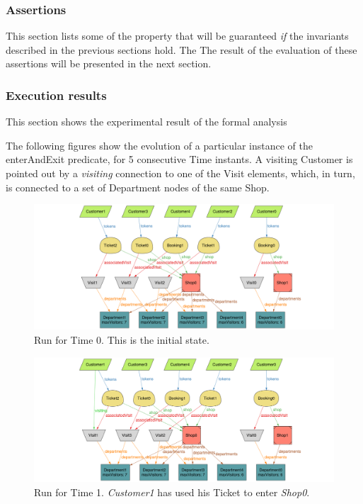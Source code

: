 \subsubsection{Assertions}
This section lists some of the property that will be guaranteed \emph{if} the invariants described in the previous sections hold. The The result of the evaluation of these assertions will be presented in the next section.

\subsubsection{Execution results}
This section shows the experimental result of the formal analysis 


\pagebreak
The following figures show the evolution of a particular instance of the enterAndExit predicate, for 5 consecutive Time instants. A visiting Customer is pointed out by a \emph{visiting} connection to one of the Visit elements, which, in turn, is connected to a set of Department nodes of the same Shop.
\begin{figure}[H]
    \centering
    \includegraphics[height=0.25\textheight]{Images/Alloy/5Customers_v1_t0.png}
    \caption{Run for Time 0. This is the initial state.}
\end{figure}
\begin{figure}[H]
    \centering
    \includegraphics[height=0.25\textheight]{Images/Alloy/5Customers_v1_t1.png}
    \caption{Run for Time 1. \emph{Customer1} has used his Ticket to enter \emph{Shop0}.}
\end{figure}
